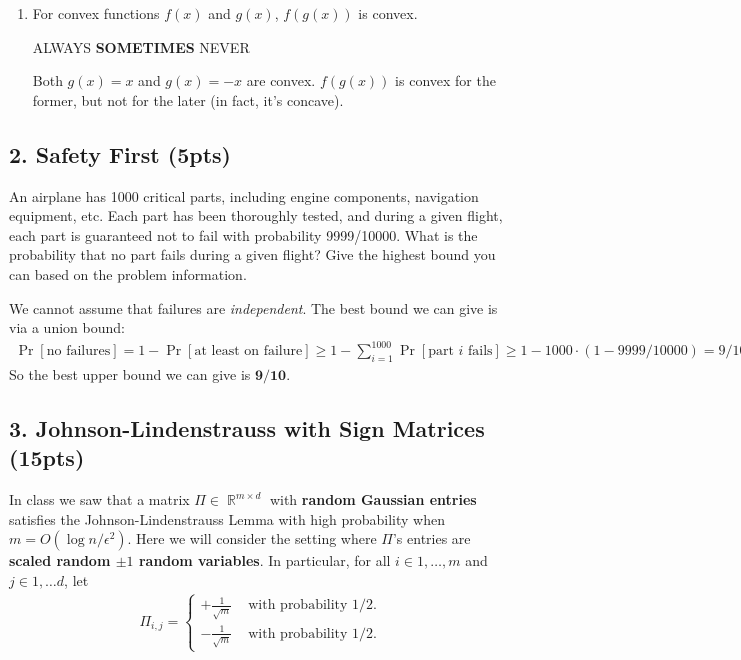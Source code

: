\documentclass[10pt]{article}
\DeclareMathOperator{\R}{\mathbb{R}}
\begin{document}
\begin{enumerate}[label=(\alph*)]
	\item For convex functions $f(x)$ and $g(x)$, $f(g(x))$ is convex.
	
	ALWAYS\hspace{1em} \textbf{SOMETIMES}\hspace{1em} NEVER
	
	Both $g(x) = x$ and $g(x) = -x$ are convex. $f(g(x))$ is convex for the former, but not for the later (in fact, it's concave).
	
%	
\end{enumerate}


\subsection{2. Safety First (\textbf{\small 5pts})}
An airplane has 1000 critical parts, including engine components, navigation equipment, etc. Each part has been thoroughly tested, and during a given flight, each part is guaranteed not to fail with probability 9999/10000. 
What is the probability that no part fails during a given flight? Give the highest bound you can based on the problem information. 
\vspace{1em}

We cannot assume that failures are \emph{independent}. The best bound we can give is via a union bound:
\begin{align*}
\Pr[\text{no failures}] = 1- \Pr[\text{at least on failure}] \geq 1 - \sum_{i=1}^{1000} \Pr[\text{part $i$ fails}] \geq 1 - 1000\cdot (1-9999/10000) = 9/10.
\end{align*}
So the best upper bound we can give is $\mathbf{9/10}$.

\subsection{3. Johnson-Lindenstrauss with Sign Matrices (\textbf{\small 15pts})}
In class we saw that a matrix ${\Pi} \in\R^{m \times d}$ with \textbf{random Gaussian entries} satisfies the Johnson-Lindenstrauss Lemma with high probability when $m = {O(\log n /\epsilon^2)}$. Here we will consider the setting where $\Pi$'s entries are \textbf{scaled random $\pm 1$ random variables}. In particular, for all $i \in 1,\ldots, m$ and $j \in 1,\ldots d$, let 
\begin{align*}
\Pi_{i,j} = \begin{cases}
+\frac{1}{\sqrt{m}} & \text{ with probability $1/2$.} \\
-\frac{1}{\sqrt{m}} & \text{ with probability $1/2$.} 
\end{cases}
\end{align*}
\end{document}
